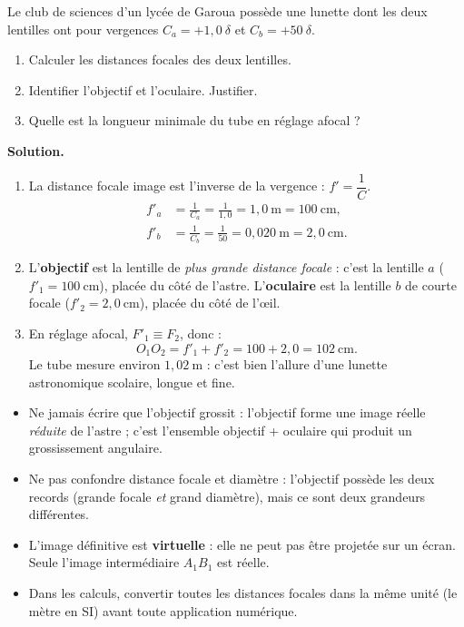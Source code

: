 \documentclass[11pt]{article}
\begin{document}
\begin{exoresolu}
Le club de sciences d'un lycée de Garoua possède une lunette dont les deux lentilles ont pour vergences $C_a = +1{,}0\ \delta$ et $C_b = +50\ \delta$.
\begin{enumerate}
\item Calculer les distances focales des deux lentilles.
\item Identifier l'objectif et l'oculaire. Justifier.
\item Quelle est la longueur minimale du tube en réglage afocal ?
\end{enumerate}
\tcblower
\textbf{Solution.}
\begin{enumerate}
\item La distance focale image est l'inverse de la vergence : $f' = \dfrac{1}{C}$.
\begin{align*}
f'_a &= \frac{1}{C_a} = \frac{1}{1{,}0} = 1{,}0\ \text{m} = 100\ \text{cm},\\
f'_b &= \frac{1}{C_b} = \frac{1}{50} = 0{,}020\ \text{m} = 2{,}0\ \text{cm}.
\end{align*}
\item L'\textbf{objectif} est la lentille de \emph{plus grande distance focale} : c'est la lentille $a$ ($f'_1 = 100\ \text{cm}$), placée du côté de l'astre. L'\textbf{oculaire} est la lentille $b$ de courte focale ($f'_2 = 2{,}0\ \text{cm}$), placée du côté de l'œil.
\item En réglage afocal, $F'_1 \equiv F_2$, donc :
\[
O_1O_2 = f'_1 + f'_2 = 100 + 2{,}0 = 102\ \text{cm}.
\]
Le tube mesure environ $1{,}02\ \text{m}$ : c'est bien l'allure d'une lunette astronomique scolaire, longue et fine.
\end{enumerate}
\end{exoresolu}

\begin{attention}
\begin{itemize}
\item Ne jamais écrire que l'objectif \og grossit \fg{} : l'objectif forme une image réelle \emph{réduite} de l'astre ; c'est l'ensemble objectif + oculaire qui produit un grossissement angulaire.
\item Ne pas confondre distance focale et diamètre : l'objectif possède les deux \og records \fg{} (grande focale \emph{et} grand diamètre), mais ce sont deux grandeurs différentes.
\item L'image définitive est \textbf{virtuelle} : elle ne peut pas être projetée sur un écran. Seule l'image intermédiaire $A_1B_1$ est réelle.
\item Dans les calculs, convertir toutes les distances focales dans la même unité (le mètre en SI) avant toute application numérique.
\end{itemize}
\end{attention}
\end{document}
